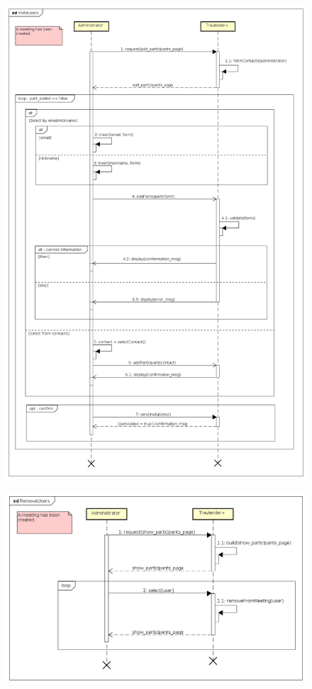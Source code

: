 \begin{figure}[!h]
\centering\includegraphics[height=\textheight]{Images/SequenceDiagrams/Admin/InviteUsers.png}{}
\caption{}
\end{figure}

\begin{figure}[!h]
\centering\includegraphics[width=\textwidth]{Images/SequenceDiagrams/Admin/RemoveUsers.png}{}
\caption{}
\end{figure}

